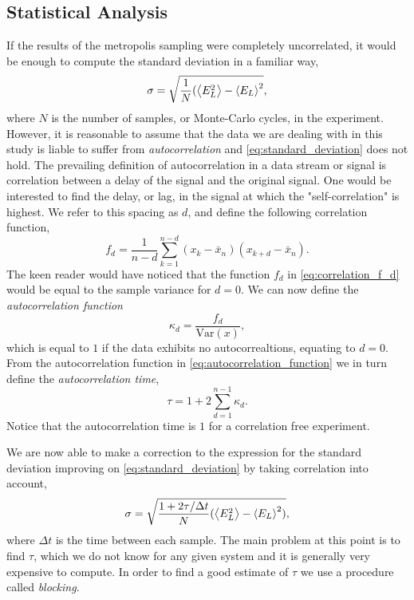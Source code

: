 \documentclass[
    a4paper, aps, twocolumn, floatfix, superscriptaddress,
    nofootinbib]{revtex4-1}
\newcommand{\1}{\mathds{1}}
\begin{document}
    \subsection{Statistical Analysis}
        If the results of the metropolis sampling were completely uncorrelated,
        it would be enough to compute the standard deviation in a familiar way,
        \begin{equation}
            \sigma = \sqrt{\frac{1}{N}(\ev{E^2_L} - \ev{E_L}^2},
            \label{eq:standard_deviation}
        \end{equation}
        where $N$ is the number of samples, or Monte-Carlo cycles, in the
        experiment.  However, it is reasonable to assume that the data we are
        dealing with in this study is liable to suffer from
        \emph{autocorrelation} and \autoref{eq:standard_deviation} does not
        hold. The prevailing definition of autocorrelation in a data stream or
        signal is correlation between a delay of the signal and the original
        signal. One would be interested to find the delay, or lag, in the signal
        at which the "self-correlation" is highest. We refer to this spacing as
        $d$, and define the following correlation function,
        \begin{equation}
            f_d
            = \frac{1}{n -d} \sum_{k=1}^{n-d}
            (x_k - \bar{x}_n)(x_{k+d} - \bar{x}_n).
            \label{eq:correlation_f_d}
        \end{equation}
        The keen reader would have noticed that the function $f_d$ in
        \autoref{eq:correlation_f_d} would be equal to the sample variance for
        $d=0$. We can now define the \emph{autocorrelation function}
        \begin{equation}
            \kappa_d = \frac{f_d}{\text{Var}(x)},
            \label{eq:autocorrelation_function}
        \end{equation}
        which is equal to $1$ if the data exhibits no autocorrealtions, equating
        to $d=0$. From the autocorrelation function in
        \autoref{eq:autocorrelation_function} we in turn define the
        \emph{autocorrelation time},
        \begin{equation}
            \tau = 1 + 2 \sum_{d=1}^{n-1}\kappa_d.
        \end{equation}
        Notice that the autocorrelation time is $1$ for a correlation free
        experiment.

        We are now able to make a correction to the expression for the standard
        deviation improving on \autoref{eq:standard_deviation} by taking
        correlation into account,
        \begin{equation}
            \sigma =\sqrt{\frac{1 + 2\tau / \Delta t}{N}
            (\ev{E^2_L} - \ev{E_L}^2)},
        \end{equation}
        where $\Delta t$ is the time between each sample. The main problem at
        this point is to find $\tau$, which we do not know for any given system
        and it is generally very expensive to compute. In order to find a good
        estimate of $\tau$ we use a procedure called \emph{blocking}.
\end{document}
